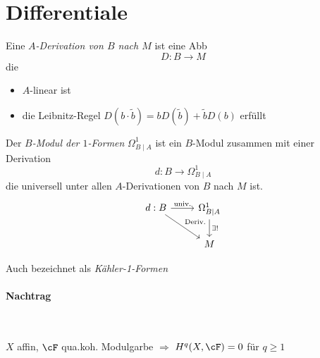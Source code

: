 \section{Differentiale} %

\begin{defn}
Eine \emph{$A$-Derivation von $B$ nach $M$} ist eine Abb
\[
  D:B\rightarrow M
\]
die
\begin{itemize}
\item $A$-linear ist
\item die Leibnitz-Regel $D(b\cdot\tilde b)=bD(\tilde b)+\tilde bD(b)$
erfüllt
\end{itemize}
\end{defn}

\begin{defn}
Der \emph{$B$-Modul der $1$-Formen} $\Omega_{B\mid A}^1$ ist ein $B$-Modul
zusammen mit einer Derivation
\[
  d:B\rightarrow \Omega_{B\mid A}^1
\]
die universell unter allen $A$-Derivationen von $B$ nach $M$ ist.
	\[\begin{tikzcd}
		d:B \rar{\text{univ.}} \arrow{dr}{\text{Deriv.}} & \Omega_{B\mid A}^1 \dar{\exists!} \\
		                                                 & M
	\end{tikzcd}\]
\end{defn}
\begin{bem}
Auch bezeichnet als \emph{Kähler-1-Formen}
\end{bem}

\paragraph{Nachtrag}\\
\begin{thm}
$X$ affin, $\cF$ qua.koh. Modulgarbe $\Rightarrow$ $H^q(X,\cF)=0$ für $q\geq 1$
\end{thm}

